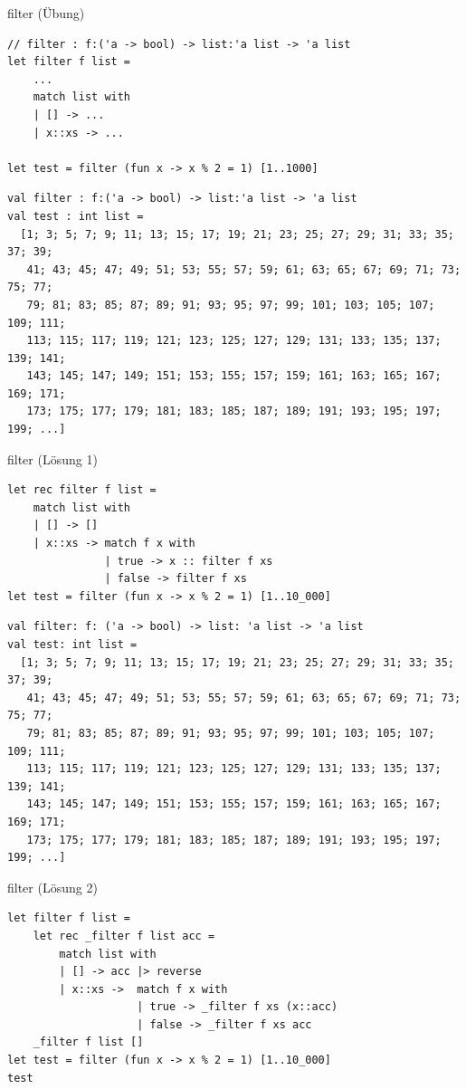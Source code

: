 \documentclass[t]{beamer}
\begin{document}
\begin{frame}[label={sec:org52b5d3e},fragile]{filter (Übung)}
 \begin{verbatim}
// filter : f:('a -> bool) -> list:'a list -> 'a list
let filter f list =
    ...
    match list with
    | [] -> ...
    | x::xs -> ...

let test = filter (fun x -> x % 2 = 1) [1..1000]
\end{verbatim}

\begin{verbatim}
val filter : f:('a -> bool) -> list:'a list -> 'a list
val test : int list =
  [1; 3; 5; 7; 9; 11; 13; 15; 17; 19; 21; 23; 25; 27; 29; 31; 33; 35; 37; 39;
   41; 43; 45; 47; 49; 51; 53; 55; 57; 59; 61; 63; 65; 67; 69; 71; 73; 75; 77;
   79; 81; 83; 85; 87; 89; 91; 93; 95; 97; 99; 101; 103; 105; 107; 109; 111;
   113; 115; 117; 119; 121; 123; 125; 127; 129; 131; 133; 135; 137; 139; 141;
   143; 145; 147; 149; 151; 153; 155; 157; 159; 161; 163; 165; 167; 169; 171;
   173; 175; 177; 179; 181; 183; 185; 187; 189; 191; 193; 195; 197; 199; ...]
\end{verbatim}
\end{frame}

\begin{frame}[label={sec:orga32ee65},fragile]{filter (Lösung 1)}
 \begin{verbatim}
let rec filter f list = 
    match list with
    | [] -> []
    | x::xs -> match f x with
               | true -> x :: filter f xs
               | false -> filter f xs
let test = filter (fun x -> x % 2 = 1) [1..10_000]
\end{verbatim}

\begin{verbatim}
val filter: f: ('a -> bool) -> list: 'a list -> 'a list
val test: int list =
  [1; 3; 5; 7; 9; 11; 13; 15; 17; 19; 21; 23; 25; 27; 29; 31; 33; 35; 37; 39;
   41; 43; 45; 47; 49; 51; 53; 55; 57; 59; 61; 63; 65; 67; 69; 71; 73; 75; 77;
   79; 81; 83; 85; 87; 89; 91; 93; 95; 97; 99; 101; 103; 105; 107; 109; 111;
   113; 115; 117; 119; 121; 123; 125; 127; 129; 131; 133; 135; 137; 139; 141;
   143; 145; 147; 149; 151; 153; 155; 157; 159; 161; 163; 165; 167; 169; 171;
   173; 175; 177; 179; 181; 183; 185; 187; 189; 191; 193; 195; 197; 199; ...]
\end{verbatim}
\end{frame}

\begin{frame}[label={sec:org0b28447},fragile]{filter (Lösung 2)}
 \begin{verbatim}
let filter f list = 
    let rec _filter f list acc = 
        match list with
        | [] -> acc |> reverse
        | x::xs ->  match f x with
                    | true -> _filter f xs (x::acc)
                    | false -> _filter f xs acc
    _filter f list []
let test = filter (fun x -> x % 2 = 1) [1..10_000]
test
\end{verbatim}
\end{frame}
\end{document}
